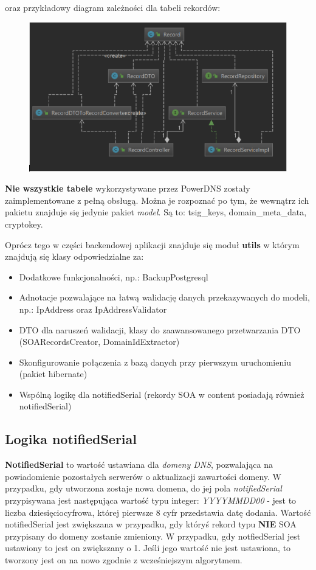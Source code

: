 \documentclass[11pt]{article}
\begin{document}
oraz przykładowy diagram zależności dla tabeli rekordów:
\begin{figure}[H]
\centering
\includegraphics[width=\textwidth]{res/back_diagram_zaleznosci}
\end{figure}
\textbf{Nie wszystkie tabele} wykorzystywane przez PowerDNS zostały zaimplementowane z pełną obsługą. Można je rozpoznać po tym, że wewnątrz ich pakietu znajduje się jedynie pakiet \emph{model}. Są to: tsig\_keys, domain\_meta\_data, cryptokey. 

Oprócz tego w części backendowej aplikacji znajduje się moduł \textbf{utils} w którym znajdują się klasy odpowiedzialne za:
\begin{itemize}
\item Dodatkowe funkcjonalności, np.: BackupPostgresql
\item Adnotacje pozwalające na łatwą walidację danych przekazywanych do modeli, np.: IpAddress oraz IpAddressValidator
\item DTO dla naruszeń walidacji, klasy do zaawansowanego przetwarzania DTO (SOARecordsCreator, DomainIdExtractor)
\item Skonfigurowanie połączenia z bazą danych przy pierwszym uruchomieniu (pakiet hibernate)
\item Wspólną logikę dla notifiedSerial (rekordy SOA w content posiadają również notifiedSerial)
\end{itemize}


\subsection{Logika notifiedSerial}
\textbf{NotifiedSerial} to wartość ustawiana dla \emph{domeny DNS}, pozwalająca na powiadomienie pozostałych serwerów o aktualizacji zawartości domeny. W przypadku, gdy utworzona zostaje nowa domena, do jej pola \emph{notifiedSerial} przypisywana jest następująca wartość typu integer: \emph{YYYYMMDD00} - jest to liczba dziesięciocyfrowa, której pierwsze 8 cyfr przedstawia datę dodania. \newline
Wartość notifiedSerial jest zwiększana w przypadku, gdy któryś rekord typu \textbf{NIE} SOA przypisany do domeny zostanie zmieniony. W przypadku, gdy notfiedSerial jest ustawiony to jest on zwiększany o 1. Jeśli jego wartość nie jest ustawiona, to tworzony jest on na nowo zgodnie z wcześniejszym algorytmem.
\end{document}
